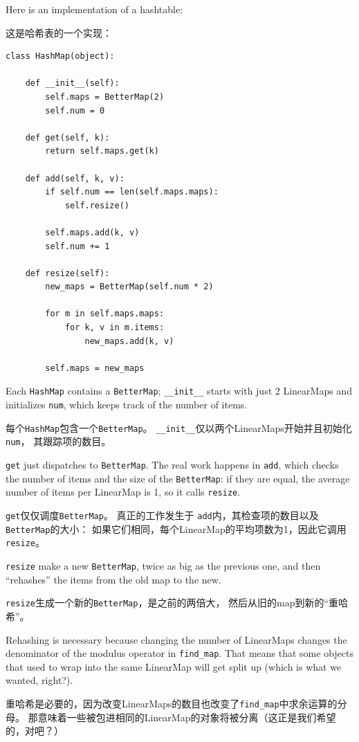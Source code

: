 \documentclass[10pt]{book}
\begin{document}
\begin{CJK}{UTF8}{gbsn}
Here is an implementation of a hashtable:

这是哈希表的一个实现：

\begin{verbatim}
class HashMap(object):

    def __init__(self):
        self.maps = BetterMap(2)
        self.num = 0

    def get(self, k):
        return self.maps.get(k)

    def add(self, k, v):
        if self.num == len(self.maps.maps):
            self.resize()

        self.maps.add(k, v)
        self.num += 1

    def resize(self):
        new_maps = BetterMap(self.num * 2)

        for m in self.maps.maps:
            for k, v in m.items:
                new_maps.add(k, v)

        self.maps = new_maps
\end{verbatim}

Each {\tt HashMap} contains a {\tt BetterMap}; \verb"__init__" starts
with just 2 LinearMaps and initializes {\tt num}, which keeps track of
the number of items.

每个{\tt HashMap}包含一个{\tt BetterMap}。
\verb"__init__"仅以两个LinearMaps开始并且初始化{\tt num}，
其跟踪项的数目。

{\tt get} just dispatches to {\tt BetterMap}.  The real work happens
in {\tt add}, which checks the number of items and the size of the
{\tt BetterMap}: if they are equal, the average number of items per
LinearMap is 1, so it calls {\tt resize}.

{\tt get}仅仅调度{\tt BetterMap}。
真正的工作发生于 {\tt add}内，其检查项的数目以及{\tt BetterMap}的大小：
如果它们相同，每个LinearMap的平均项数为1，因此它调用{\tt resize}。

{\tt resize} make a new {\tt BetterMap}, twice as big as the previous
one, and then ``rehashes'' the items from the old map to the new.

{\tt resize}生成一个新的{\tt BetterMap}，是之前的两倍大，
然后从旧的map到新的``重哈希''。

Rehashing is necessary because changing the number of LinearMaps
changes the denominator of the modulus operator in
\verb"find_map".  That means that some objects that used
to wrap into the same LinearMap will get split up (which is
what we wanted, right?).

重哈希是必要的，因为改变LinearMaps的数目也改变了\verb"find_map"中求余运算的分母。
那意味着一些被包进相同的LinearMap的对象将被分离（这正是我们希望的，对吧？）


\end{CJK}
\end{document}

